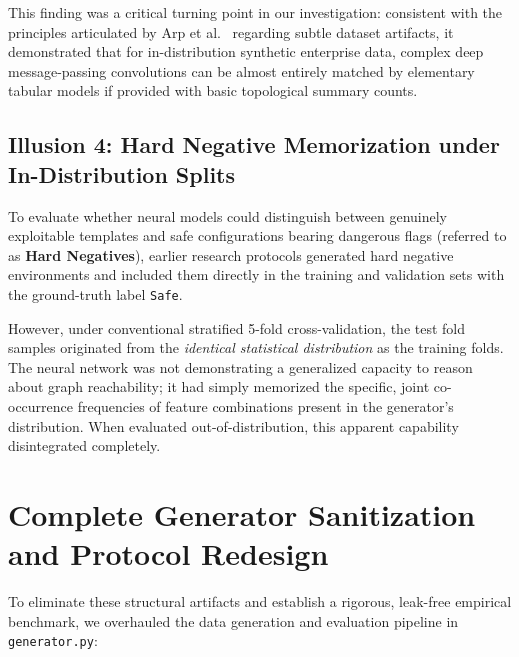 This finding was a critical turning point in our investigation: consistent with the principles articulated by Arp et al.~\cite{arp2022dos} regarding subtle dataset artifacts, it demonstrated that for in-distribution synthetic enterprise data, complex deep message-passing convolutions can be almost entirely matched by elementary tabular models if provided with basic topological summary counts.

\subsection{Illusion 4: Hard Negative Memorization under In-Distribution Splits}
To evaluate whether neural models could distinguish between genuinely exploitable templates and safe configurations bearing dangerous flags (referred to as \textbf{Hard Negatives}), earlier research protocols generated hard negative environments and included them directly in the training and validation sets with the ground-truth label \texttt{Safe}.

However, under conventional stratified 5-fold cross-validation, the test fold samples originated from the \textit{identical statistical distribution} as the training folds. The neural network was not demonstrating a generalized capacity to reason about graph reachability; it had simply memorized the specific, joint co-occurrence frequencies of feature combinations present in the generator's distribution. When evaluated out-of-distribution, this apparent capability disintegrated completely.

\section{Complete Generator Sanitization and Protocol Redesign}
To eliminate these structural artifacts and establish a rigorous, leak-free empirical benchmark, we overhauled the data generation and evaluation pipeline in \texttt{generator.py}:

